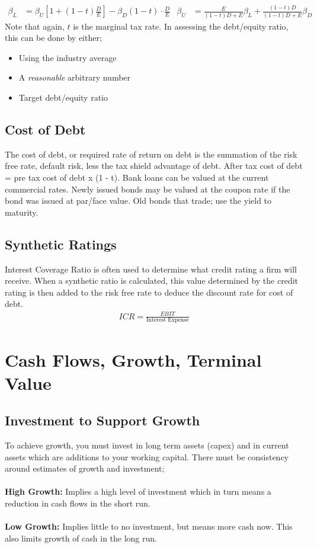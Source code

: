 \documentclass[a4paper]{article}
\begin{document}
\begin{align*}
\beta_L &= \beta_U [1 + (1 - t)\frac{D}{E} ] - \beta_D (1-t) \cdot \frac{D}{E} &
\beta_U &= \frac{E}{(1 - t)D + E}\beta_L + \frac{(1-t)D}{(1-t)D + E}\beta_D
\end{align*}
Note that again, $t$ is the marginal tax rate. In assessing the debt/equity
ratio, this can be done by either;
\begin{itemize}
\item Using the industry average
\item A \emph{reasonable} arbitrary number
\item Target debt/equity ratio
\end{itemize}
\subsection{Cost of Debt}
The cost of debt, or required rate of return on debt is the summation of the
risk free rate, default risk, less the tax shield advantage of debt. After tax
cost of debt = pre tax cost of debt x (1 - t). Bank loans can be valued at the
current commercial rates. Newly issued bonds may be valued at the coupon rate
if the bond was issued at par/face value. Old bonds that trade; use the yield to
maturity.
\subsection{Synthetic Ratings}
Interest Coverage Ratio is often used to determine what credit rating a firm
will receive. When a synthetic ratio is calculated, this value determined
by the credit rating is then added to the risk free rate to deduce the discount
rate for cost of debt.
\begin{align*}
ICR = \frac{EBIT}{\text{Interest Expense}}
\end{align*}


\section{Cash Flows, Growth, Terminal Value}

\subsection{Investment to Support Growth}
To achieve growth, you must invest in long term assets (capex) and in
current assets which are additions to your working capital. There must be
consistency around estimates of growth and investment;\\\\
%
%
\textbf{High Growth:} Implies a high level of investment which in turn means
a reduction in cash flows in the short run.\\\\
%
%
\textbf{Low Growth:} Implies little to no investment, but means more cash now.
This also limits growth of cash in the long run.
\end{document}
